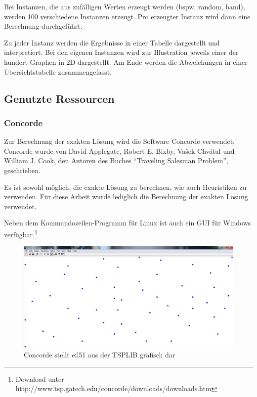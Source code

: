 \documentclass[11pt,a4paper]{article}
\begin{document}
Bei Instanzen, die aus zufälligen Werten erzeugt werden (bspw. random, band), werden 100 verschiedene Instanzen erzeugt. Pro erzeugter Instanz wird dann eine Berechnung durchgeführt.

Zu jeder Instanz werden die Ergebnisse in einer Tabelle dargestellt und interpretiert. Bei den eigenen Instanzen wird zur Illustration jeweils einer der hundert Graphen in 2D dargestellt. Am Ende werden die Abweichungen in einer Übersichtstabelle zusammengefasst.

\subsection{Genutzte Ressourcen}
\subsubsection{Concorde}
Zur Berechnung der exakten Lösung wird die Software Concorde verwendet. Concorde wurde von David Applegate, Robert E. Bixby, Vašek Chvátal und William J. Cook, den Autoren des Buches "`Traveling Salesman Problem"'\cite{applegate06}, geschrieben.

Es ist sowohl möglich, die exakte Lösung zu berechnen, wie auch Heuristiken zu verwenden. Für diese Arbeit wurde lediglich die Berechnung der exakten Lösung verwendet.

Neben dem Kommandozeilen-Programm für Linux ist auch ein GUI für Windows verfügbar.\footnote{Download unter http://www.tsp.gatech.edu/concorde/downloads/downloads.htm}

\begin{figure}[H]
        \centering
        \includegraphics[width=14cm]{gfx/concorde_cities}
        \caption{Concorde stellt eil51 aus der TSPLIB grafisch dar}
        \label{img:concorde_cities}
\end{figure}
\end{document}
